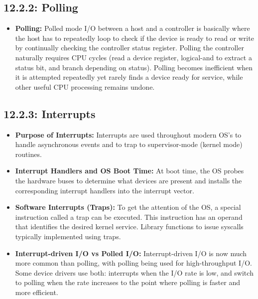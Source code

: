 \documentclass[12pt]{article}
\begin{document}
\subsection*{12.2.2: Polling}

\begin{itemize}
    \item \textbf{Polling:} Polled mode I/O between a host and a controller is basically where the host has to repeatedly loop to check if the device is ready to read or write by continually checking the controller status register. Polling the controller naturally requires CPU cycles (read a device register, logical-and to extract a status bit, and branch depending on status). Polling becomes inefficient when it is attempted repeatedly yet rarely finds a device ready for service, while other useful CPU processing remains undone.
\end{itemize}

\subsection*{12.2.3: Interrupts}

\begin{itemize}
    \item \textbf{Purpose of Interrupts:} Interrupts are used throughout modern OS's to handle asynchronous events and to trap to supervisor-mode (kernel mode) routines.
    \item \textbf{Interrupt Handlers and OS Boot Time:} At boot time, the OS probes the hardware buses to determine what devices are present and installs the corresponding interrupt handlers into the interrupt vector.
    \item \textbf{Software Interrupts (Traps):} To get the attention of the OS, a special instruction called a trap can be executed. This instruction has an operand that identifies the desired kernel service. Library functions to issue syscalls typically implemented using traps.
    \item \textbf{Interrupt-driven I/O vs Polled I/O:} Interrupt-driven I/O is now much more common than polling, with polling being used for high-throughput I/O. Some device drivers use both: interrupts when the I/O rate is low, and switch to polling when the rate increases to the point where polling is faster and more efficient.
\end{itemize}
\end{document}
